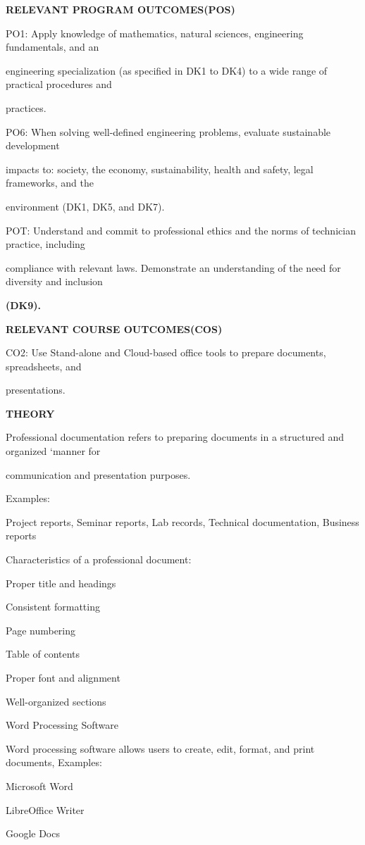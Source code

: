 \documentclass[10pt,a4paper]{article}
\begin{document}
\medskip\noindent\textbf{RELEVANT PROGRAM OUTCOMES(POS)}\par
\noindent PO1: Apply knowledge of mathematics, natural sciences, engineering fundamentals, and an\par
\noindent engineering specialization (as specified in DK1 to DK4) to a wide range of practical procedures and\par
\noindent practices.\par
\noindent PO6: When solving well-defined engineering problems, evaluate sustainable development\par
\noindent impacts to: society, the economy, sustainability, health and safety, legal frameworks, and the\par
\noindent environment (DK1, DK5, and DK7).\par
\noindent POT: Understand and commit to professional ethics and the norms of technician practice, including\par
\noindent compliance with relevant laws. Demonstrate an understanding of the need for diversity and inclusion\par
\medskip\noindent\textbf{(DK9).}\par

\medskip\noindent\textbf{RELEVANT COURSE OUTCOMES(COS)}\par
\noindent CO2: Use Stand-alone and Cloud-based office tools to prepare documents, spreadsheets, and\par
\noindent presentations.\par

\medskip\noindent\textbf{THEORY}\par
\noindent Professional documentation refers to preparing documents in a structured and organized ‘manner for\par
\noindent communication and presentation purposes.\par

\noindent Examples:\par
\noindent\textbullet\; Project reports, Seminar reports, Lab records, Technical documentation, Business reports\par
\noindent Characteristics of a professional document:\par
\noindent\textbullet\; Proper title and headings\par
\noindent\textbullet\; Consistent formatting\par
\noindent\textbullet\; Page numbering\par
\noindent\textbullet\; Table of contents\par
\noindent\textbullet\; Proper font and alignment\par
\noindent\textbullet\; Well-organized sections\par
\noindent Word Processing Software\par
\noindent Word processing software allows users to create, edit, format, and print documents, Examples:\par
\noindent\textbullet\; Microsoft Word\par
\noindent\textbullet\; LibreOffice Writer\par
\noindent\textbullet\; Google Docs\par
\end{document}
